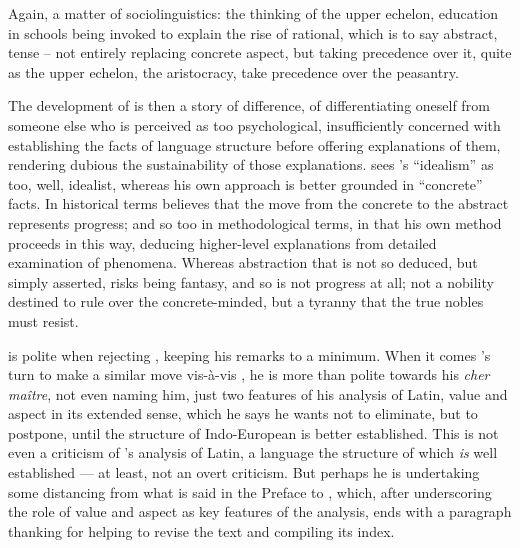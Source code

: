 \documentclass[output=paper]{langscibook}
\begin{document}
Again, a matter of sociolinguistics: the thinking of the upper echelon, education in schools being invoked to explain the rise of rational, which is to say abstract, tense -- not entirely replacing concrete aspect, but taking precedence over it, quite as the upper echelon, the aristocracy, take precedence over the peasantry.

The development of  is then a story of difference, of differentiating oneself from someone else who is perceived as too psychological, insufficiently concerned with establishing the facts of language structure before offering explanations of them, rendering dubious the sustainability of those explanations. {\Meillet} sees {\Vossler}'s ``idealism'' as too, well, idealist, whereas his own approach is better grounded in ``concrete'' facts. In historical terms {\Meillet} believes that the move from the concrete to the abstract represents progress; and so too in methodological terms, in that his own method proceeds in this way, deducing higher-level explanations from detailed examination of phenomena. Whereas abstraction that is not so deduced, but simply asserted, risks being fantasy, and so is not progress at all; not a nobility destined to rule over the concrete-minded, but a tyranny that the true nobles must resist.

{\Meillet} is polite when rejecting {\Vossler}, keeping his remarks to a minimum. When it comes {\Benveniste}'s turn to make a similar move vis-à-vis {\Meillet}, he is more than polite towards his \emph{cher maître}, not even naming him, just two features of his analysis of Latin, value and aspect in its extended sense, which he says he wants not to eliminate, but to postpone, until the structure of Indo-European is better established. This is not even a criticism of {\Meillet}'s analysis of Latin, a language the structure of which \emph{is} well established — at least, not an overt criticism. But perhaps he is undertaking some distancing from what is said in the Preface to \citet{Meillet1931}, which, after underscoring the role of value and aspect as key features of the analysis, ends with a paragraph thanking {\Benveniste} for helping to revise the text and compiling its index.
\end{document}
